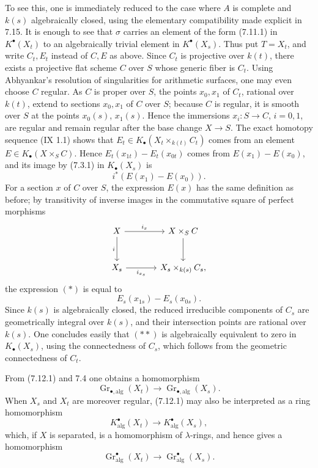 \documentclass[11pt]{article}
\newcommand{\Gr}{\operatorname{Gr}}
\providecommand{\Gr}{\operatorname{Gr}}
\providecommand{\Gr}{\operatorname{G}}
\begin{document}
To see this, one is immediately reduced to the case where \(A\) is complete and \(k(s)\) algebraically closed, using the elementary compatibility made explicit in 7.15. It is enough to see that \(\sigma\) carries an element of the form (7.11.1) in \(K^\bullet(X_t)\) to an algebraically trivial element in \(K^\bullet(X_s)\). Thus put \(T=X_t\), and write \(C_t,E_t\) instead of \(C,E\) as above. Since \(C_t\) is projective over \(k(t)\), there exists a projective flat scheme \(C\) over \(S\) whose generic fiber is \(C_t\). Using Abhyankar's resolution of singularities for arithmetic surfaces, one may even choose \(C\) regular. As \(C\) is proper over \(S\), the points \(x_0,x_1\) of \(C_t\), rational over \(k(t)\), extend to sections \(x_0,x_1\) of \(C\) over \(S\); because \(C\) is regular, it is smooth over \(S\) at the points \(x_0(s)\), \(x_1(s)\). Hence the immersions \(x_i:S\to C\), \(i=0,1\), are regular and remain regular after the base change \(X\to S\). The exact homotopy sequence (IX 1.1) shows that \(E_t\in K_\bullet(X_t\times_{k(t)}C_t)\) comes from an element \(E\in K_\bullet(X\times_S C)\). Hence \(E_t(x_{1t})-E_t(x_{0t})\) comes from \(E(x_1)-E(x_0)\), and its image by (7.3.1) in \(K_\bullet(X_s)\) is
\[
  i^*(E(x_1)-E(x_0)).
\tag{*}
\]
For a section \(x\) of \(C\) over \(S\), the expression \(E(x)\) has the same definition as before; by transitivity of inverse images in the commutative square of perfect morphisms
\[
\begin{tikzcd}[column sep=large,row sep=large]
X \arrow[r,"i_x"] \arrow[d,"i"'] & X\times_S C \arrow[d]\\
X_s \arrow[r,"i_{x_s}"'] & X_s\times_{k(s)}C_s,
\end{tikzcd}
\]
the expression \((*)\) is equal to
\[
  E_s(x_{1s})-E_s(x_{0s}).
\tag{**}
\]
Since \(k(s)\) is algebraically closed, the reduced irreducible components of \(C_s\) are geometrically integral over \(k(s)\), and their intersection points are rational over \(k(s)\). One concludes easily that \((**)\) is algebraically equivalent to zero in \(K_\bullet(X_s)\), using the connectedness of \(C_s\), which follows from the geometric connectedness of \(C_t\).

From (7.12.1) and 7.4 one obtains a homomorphism
\begin{equation}\tag{7.12.2}
  \Gr_{\bullet,\mathrm{alg}}(X_t)\longrightarrow
  \Gr_{\bullet,\mathrm{alg}}(X_s).
\end{equation}
When \(X_s\) and \(X_t\) are moreover regular, (7.12.1) may also be interpreted as a ring homomorphism
\begin{equation}\tag{7.12.3}
  K^\bullet_{\mathrm{alg}}(X_t)\longrightarrow K^\bullet_{\mathrm{alg}}(X_s),
\end{equation}
which, if \(X\) is separated, is a homomorphism of \(\lambda\)-rings, and hence gives a homomorphism
\begin{equation}\tag{7.12.4}
  \Gr^\bullet_{\mathrm{alg}}(X_t)\longrightarrow \Gr^\bullet_{\mathrm{alg}}(X_s).
\end{equation}
\end{document}
